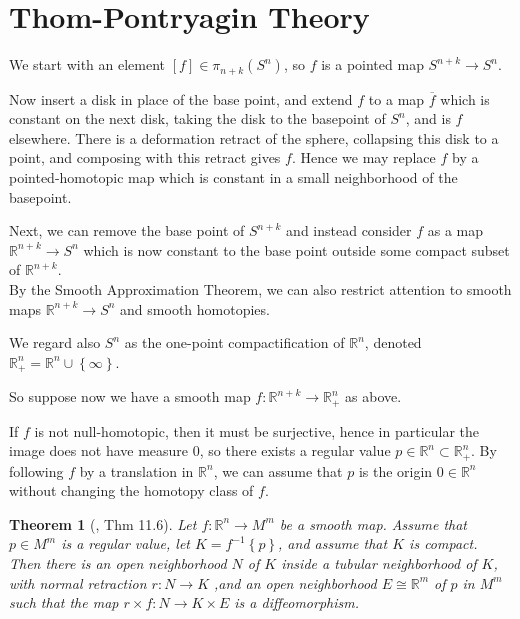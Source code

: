 \documentclass[reqno]{amsart}
\newtheorem{theorem}{Theorem}[section]
\theoremstyle{definition}
\theoremstyle{remark}
\begin{document}
\section{Thom-Pontryagin Theory}

We start with an element
$\left[ f \right]  \in \pi_{n+k}\left( S^{n} \right) $, so
$f$ is a pointed map
$S^{n+k} \to S^{n}$.

Now insert a disk in place of the
base point, and extend $f$ to a map
$\overline{f}$ which is constant on the
next disk, taking the disk to the basepoint of
$S^{n}$, and is $f$ elsewhere.
There is a deformation retract of the sphere, collapsing
this disk to a point, and composing with this retract
gives $f$. Hence we may replace $f$ by a pointed-homotopic map
which is constant in a small neighborhood of
the basepoint.

Next, we can remove the base point of
$S^{n+k}$ and instead consider $f$ as a map
$\mathbb{R}^{n+k} \to S^{n}$ which is now constant
to the base point outside some compact
subset of $\mathbb{R}^{n+k}$.\\
\linebreak
By the Smooth Approximation Theorem, we can
also restrict attention to smooth maps
$\mathbb{R}^{n+k} \to S^{n}$ and smooth
homotopies. 

We regard also $S^{n}$ as the one-point compactification
of $\mathbb{R}^{n}$, denoted
$\mathbb{R}_+^{n} = \mathbb{R}^{n} \cup  \left\{ \infty \right\} $.

So suppose now we have a smooth map $f \colon
\mathbb{R}^{n+k} \to \mathbb{R}_+^{n}$ as above.

If $f$ is not null-homotopic, then it must be surjective, hence
in particular the image does not have measure $0$, so there
exists a regular value
$p \in \mathbb{R}^{n} \subset \mathbb{R}_+^{n}$.
By following $f$ by a translation in $\mathbb{R}^{n}$,
we can assume that $p$ is the origin $0 \in \mathbb{R}^{n}$ without
changing the homotopy class of $f$.

\begin{theorem}[\cite{Bredon}, Thm 11.6]\label{Thm:XLOOQKK}
    Let $f \colon \mathbb{R}^{n} \to M^{m}$ be a smooth
    map. Assume that $p \in M^{m}$ is a regular
    value, let $K = f^{-1} \left\{ p \right\} $, and
    assume that $K$ is compact. Then there
    is an open neighborhood $N$ of $K$ inside a tubular neighborhood
    of $K$, with normal retraction $r \colon N \to K$ ,and
    an open neighborhood $E \cong \mathbb{R}^{m}$ of
    $p$ in $M^{m}$ such that the map
    $r \times f \colon N \to K \times E$ is a diffeomorphism.
\end{theorem}
\end{document}
